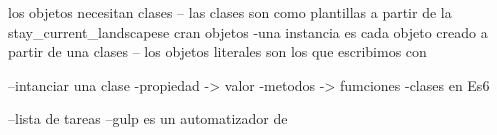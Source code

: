 los objetos necesitan clases 
-- las clases son como plantillas  a partir de la stay_current_landscapese cran objetos
-una instancia es cada objeto creado a partir de una clases
-- los objetos literales son los que escribimos con {}

    --intanciar una clase
        -propiedad -> valor
        -metodos -> fumciones
        -clases en Es6

        --lista de tareas
        --gulp es un automatizador de 